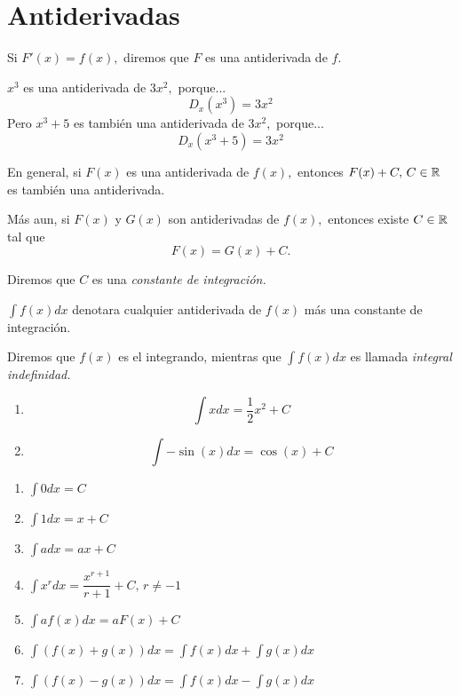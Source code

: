 \section{Antiderivadas}

 Si $F'(x)=f(x),$ diremos que $F$ es una antiderivada de $f.$

 \begin{problema}
  \label{soc:exmp:22.1}
  $x^{3}$ es una antiderivada de $3x^{2},$ porque...  
  $$
  D_{x}\left( x^{3} \right)=3x^{2}
  $$  
  Pero $x^{3}+5$ es también una antiderivada de $3x^{2},$ porque...  
  $$
  D_{x}\left( x^{3} +5 \right)=3x^{2}
  $$
 \end{problema}



 En general, si $F(x)$ es una antiderivada de $f(x),$ entonces $F(x)+C, \, C\in \mathbb{R}$ es también una antiderivada.
 

 Más aun, si $F(x)$ y $G(x)$ son antiderivadas de $f(x),$ entonces existe $C\in \mathbb{R}$ tal que
 $$
 F(x)=G(x)+C.
 $$
 

 Diremos que $C$ es una \emph{constante de integraci\'on.}



 $\int f(x)dx$ denotara cualquier antiderivada de $f(x)$ más una constante de integraci\'on.
 

 Diremos que $f(x)$ es el integrando, mientras que $\int f(x)dx$ es llamada \emph{integral indefinidad.}



 \begin{problema}
 \label{soc:exmp:22.2}
  \begin{enumerate}
   \item $$\int xdx= \dfrac{1}{2}x^{2}+C$$
   
   \item $$\int -\sin(x)dx=  \cos(x)+C$$
  \end{enumerate}

 \end{problema}




 \begin{prop}
  \begin{enumerate}
  \label{antiderivatives}
   \item $\int 0 dx=C$
   
   \item $\int 1 dx=x+C$
   
   \item $\int adx=ax+C$
   
   \item $\int x^{r}dx=\dfrac{x^{r+1}}{r+1}+C, \, r\neq-1$
   
   \item $\int af(x)dx=aF(x)+C$
   
   \item $\int \left( f(x)+g(x) \right)dx=\int f(x)dx+\int g(x)dx$
   
   \item $\int \left( f(x)-g(x) \right)dx=\int f(x)dx-\int g(x)dx$
  \end{enumerate}

 \end{prop}




